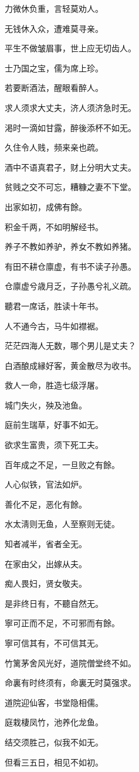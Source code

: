 \documentclass[12pt,oneside]{book}
\begin{document}
力微休负重，言轻莫劝人。

无钱休入众，遭难莫寻亲。

平生不做皱眉事，世上应无切齿人。

士乃国之宝，儒为席上珍。

若要断酒法，醒眼看醉人。

求人须求大丈夫，济人须济急时无。

渇时一滴如甘露，醉後添杯不如无。

久住令人贱，频来亲也疏。

酒中不语真君子，财上分明大丈夫。

贫贱之交不可忘，糟糠之妻不下堂。

出家如初，成佛有餘。

积金千两，不如明解经书。

养子不教如养驴，养女不教如养猪。

有田不耕仓廪虚，有书不读子孙愚。

仓廪虚兮歳月乏，子孙愚兮礼义疏。

聽君一席话，胜读十年书。

人不通今古，马牛如襟裾。

茫茫四海人无数，哪个男儿是丈夫？

白酒酿成縁好客，黄金散尽为收书。

救人一命，胜造七级浮屠。

城门失火，殃及池鱼。

庭前生瑞草，好事不如无。

欲求生富贵，须下死工夫。

百年成之不足，一旦败之有餘。

人心似铁，官法如炉。

善化不足，恶化有餘。

水太淸则无鱼，人至察则无徒。

知者减半，省者全无。

在家由父，出嫁从夫。

痴人畏妇，贤女敬夫。

是非终日有，不聽自然无。

寧可正而不足，不可邪而有餘。

寧可信其有，不可信其无。

竹篱茅舍风光好，道院僧堂终不如。

命裏有时终须有，命裏无时莫强求。

道院迎仙客，书堂隐相儒。

庭栽棲凤竹，池养化龙鱼。

结交须胜己，似我不如无。

但看三五日，相见不如初。
\end{document}
